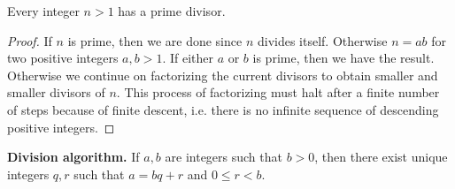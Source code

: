 \begin{lemma}
\label{lem:unique_factorization:each_integer_greater_than_1_has_prime_divisor}
Every integer $n > 1$ has a prime divisor.
\end{lemma}

\begin{proof}
If $n$ is prime, then we are done since $n$ divides itself. Otherwise
$n = ab$ for two positive integers $a,b > 1$. If either $a$ or $b$ is
prime, then we have the result. Otherwise we continue on factorizing
the current divisors to obtain smaller and smaller divisors of
$n$. This process of factorizing must halt after a finite number of
steps because of finite descent, i.e. there is
no infinite sequence of descending positive integers.
\end{proof}

\begin{theorem}
\label{thm:unique_factorization:division_algorithm}
\textbf{Division algorithm.}
If $a,b$ are integers such that $b > 0$, then there exist unique
integers $q,r$ such that $a = bq + r$ and $0 \leq r < b$.
\end{theorem}

